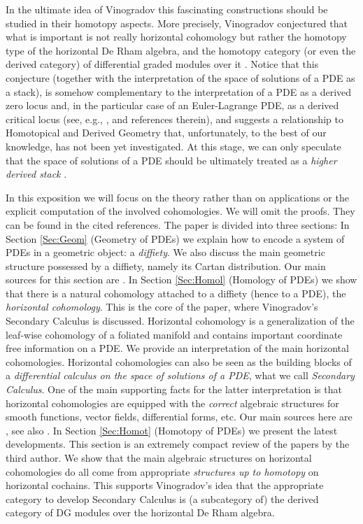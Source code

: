 \documentclass{conm-p-l}
\theoremstyle{definition}
\theoremstyle{remark}
\numberwithin{equation}{section}
\begin{document}
In the ultimate idea of Vinogradov this fascinating constructions should be studied in their homotopy aspects. More precisely, Vinogradov conjectured that what is important is not really horizontal cohomology but rather the homotopy type of the horizontal De Rham algebra, and the homotopy category (or even the derived category) of differential graded modules over it \cite[Chapter 5]{v01}. Notice that this conjecture (together with the interpretation of the space of solutions of a PDE as a stack), is somehow complementary to the interpretation of a PDE as a derived zero locus and, in the particular case of an Euler-Lagrange PDE, as a derived critical locus (see, e.g., \cite{v20}, and references therein), and suggests a relationship to Homotopical and Derived Geometry \cite{tv05, tv08, t14} that, unfortunately, to the best of our knowledge, has not been yet investigated. At this stage, we can only speculate that the space of solutions of a PDE should be ultimately treated as a \emph{higher derived stack} \cite{t10}.

In this exposition we will focus on the theory rather than on applications or the explicit computation of the involved cohomologies. We will omit the proofs. They can be found in the cited references. The paper is divided into three sections: In Section \ref{Sec:Geom} (Geometry of PDEs) we explain how to encode a system of PDEs in a geometric object: a \emph{diffiety}. We also discuss the main geometric structure possessed by a diffiety, namely its Cartan distribution. Our main sources for this section are \cite{b...99, kv98, klv86}. In Section \ref{Sec:Homol} (Homology of PDEs) we show that there is a natural cohomology attached to a diffiety (hence to a PDE), the \emph{horizontal cohomology}. This is the core of the paper, where Vinogradov's Secondary Calculus is discussed. Horizontal cohomology is a generalization of the leaf-wise cohomology of a foliated manifold and contains important coordinate free information on a PDE. We provide an interpretation of the main horizontal cohomologies. Horizontal cohomologies can also be seen as the building blocks of a \emph{differential calculus on the space of solutions of a PDE}, what we call \emph{Secondary Calculus}. One of the main supporting facts for the latter interpretation is that horizontal cohomologies are equipped with the \emph{correct} algebraic structures for smooth functions, vector fields, differential forms, etc. Our main sources here are \cite{b...99, kv98, v01}, see also \cite{v84, v09}. In Section \ref{Sec:Homot} (Homotopy of PDEs) we present the latest developments. This section is an extremely compact review of the papers \cite{vi12, v12} by the third author. We show that the main algebraic structures on horizontal cohomologies do all come from appropriate \emph{structures up to homotopy} on horizontal cochains. This supports Vinogradov's idea that the appropriate category to develop Secondary Calculus is (a subcategory of) the derived category of DG modules over the horizontal De Rham algebra.
\end{document}
